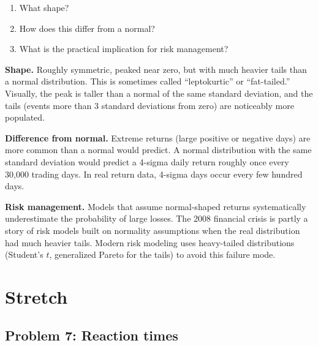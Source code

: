 \documentclass[
  letterpaper,
  11pt,
  twoside,
  openany]{scrbook}
\providecommand{\tightlist}{%
  \setlength{\itemsep}{0pt}\setlength{\parskip}{0pt}}
\begin{document}
\begin{enumerate}
\def\labelenumi{\arabic{enumi}.}
\tightlist
\item
  What shape?
\item
  How does this differ from a normal?
\item
  What is the practical implication for risk management?
\end{enumerate}

\begin{tcolorbox}[enhanced jigsaw, arc=.35mm, bottomrule=.15mm, bottomtitle=1mm, breakable, colback=white, colbacktitle=quarto-callout-note-color!10!white, colframe=quarto-callout-note-color-frame, coltitle=black, left=2mm, leftrule=.75mm, opacityback=0, opacitybacktitle=0.6, rightrule=.15mm, title=\textcolor{quarto-callout-note-color}{\faInfo}\hspace{0.5em}{Solution to Problem 6}, titlerule=0mm, toprule=.15mm, toptitle=1mm]

\textbf{Shape.} Roughly symmetric, peaked near zero, but with much
heavier tails than a normal distribution. This is sometimes called
``leptokurtic'' or ``fat-tailed.'' Visually, the peak is taller than a
normal of the same standard deviation, and the tails (events more than 3
standard deviations from zero) are noticeably more populated.

\textbf{Difference from normal.} Extreme returns (large positive or
negative days) are more common than a normal would predict. A normal
distribution with the same standard deviation would predict a 4-sigma
daily return roughly once every 30,000 trading days. In real return
data, 4-sigma days occur every few hundred days.

\textbf{Risk management.} Models that assume normal-shaped returns
systematically underestimate the probability of large losses. The 2008
financial crisis is partly a story of risk models built on normality
assumptions when the real distribution had much heavier tails. Modern
risk modeling uses heavy-tailed distributions (Student's \(t\),
generalized Pareto for the tails) to avoid this failure mode.

\end{tcolorbox}

\section{Stretch}\label{stretch}

\subsection{Problem 7: Reaction times}\label{problem-7-reaction-times}
\end{document}
